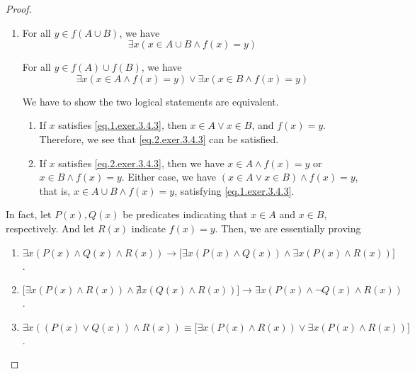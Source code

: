 \begin{proof}
\begin{enumerate}
		\item For all $y \in f(A \cup B)$, we have
		\begin{equation}
			\exists x(x \in A \cup B \wedge f(x) = y) \label{eq.1.exer.3.4.3}
		\end{equation}
	
		For all $y \in f(A) \cup f(B)$, we have
		\begin{equation}
			\exists x(x \in A \wedge f(x) = y) \vee \exists x(x \in B \wedge f(x) = y) \label{eq.2.exer.3.4.3}
		\end{equation}
		
		We have to show the two logical statements are equivalent.
		\begin{enumerate}
			\item If $x$ satisfies \eqref{eq.1.exer.3.4.3}, then $x \in A \vee x \in B$, and $f(x) = y$. Therefore, we see that \eqref{eq.2.exer.3.4.3} can be satisfied.
			
			\item If $x$ satisfies \eqref{eq.2.exer.3.4.3}, then we have $x \in A \wedge f(x) = y$ or $x \in B \wedge f(x) = y$. Either case, we have $(x \in A \vee x \in B) \wedge f(x) = y$, that is, $x \in A \cup B \wedge f(x) = y$, satisfying \eqref{eq.1.exer.3.4.3}.
		\end{enumerate}
	\end{enumerate}

	In fact, let $P(x), Q(x)$ be predicates indicating that $x \in A$ and $x \in B$, respectively. And let $R(x)$ indicate $f(x) = y$. Then, we are essentially proving
	\begin{enumerate}
		\item $\exists x(P(x) \wedge Q(x) \wedge R(x)) \to \bigl[\exists x(P(x) \wedge Q(x)) \wedge \exists x(P(x) \wedge R(x))\bigr]$.
		\item $\bigl[\exists x(P(x) \wedge R(x)) \wedge \nexists x(Q(x) \wedge R(x))\bigr] \to \exists x(P(x) \wedge \neg Q(x) \wedge R(x))$.
		\item $\exists x((P(x) \vee Q(x)) \wedge R(x)) \equiv \bigl[\exists x(P(x) \wedge R(x)) \vee \exists x (P(x) \wedge R(x))\bigr]$.
	\end{enumerate}
\end{proof}

